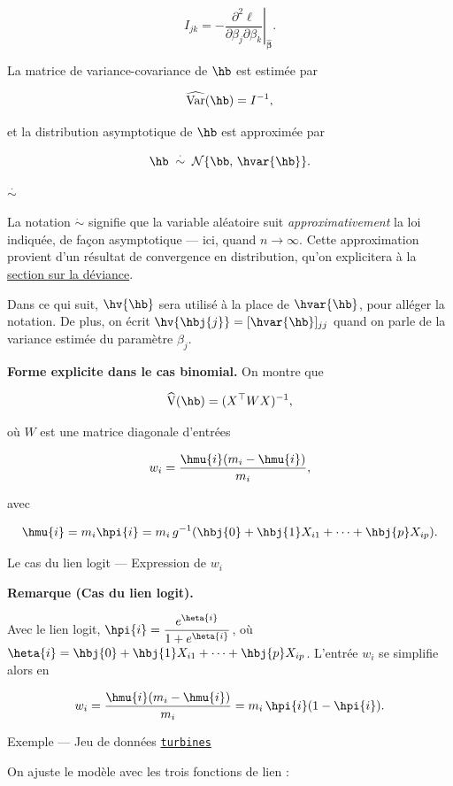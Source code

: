 \documentclass[
  french,
  letterpaper,
  DIV=11,
  numbers=noendperiod]{scrreprt}
\begin{document}
\[
I_{jk} = -\left.\frac{\partial^2 \ell}{\partial \beta_j \partial \beta_k}\right|_{\hat{\boldsymbol{\beta}}}.
\]

La matrice de variance-covariance de \(\hb\) est estimée par

\[
\widehat{\text{Var}}(\hb) = I^{-1},
\]

et la distribution asymptotique de \(\hb\) est approximée par

\[
\hb \;\overset{\cdot}{\sim}\; \mathcal{N}\{\bb,\, \hvar{\hb} \}.
\]

\(\overset{\cdot}{\sim}\)

La notation \(\dot\sim\) signifie que la variable aléatoire suit
\emph{approximativement} la loi indiquée, de façon asymptotique --- ici,
quand \(n\to\infty\). Cette approximation provient d'un résultat de
convergence en distribution, qu'on explicitera à la
\hyperref[sec-deviance]{section sur la déviance}.

Dans ce qui suit, \(\hv{\hb}\) sera utilisé à la place de
\(\hvar{\hb}\), pour alléger la notation. De plus, on écrit
\(\hv{\hbj{j}}=[\hvar{\hb}]_{jj}\) quand on parle de la variance estimée
du paramètre \(\beta_j\).

\textbf{Forme explicite dans le cas binomial.} On montre que

\[
\widehat{\text{V}}(\hb)  = (X^\top W X)^{-1},
\]

où \(W\) est une matrice diagonale d'entrées

\[
w_i = \frac{\hmu{i} (m_i - \hmu{i})}{m_i},
\]

avec

\[
\hmu{i} = m_i \hpi{i} = m_i\, g^{-1}(\hbj{0} + \hbj{1} X_{i1} + \cdots + \hbj{p} X_{ip}).
\]

{Le cas du lien logit --- Expression de \(w_i\)}

\textbf{Remarque (Cas du lien logit).}

Avec le lien logit, \(\hpi{i} = \dfrac{e^{\heta{i}}}{1+e^{\heta{i}}}\),
où \(\heta{i} = \hbj{0} + \hbj{1} X_{i1} + \cdots + \hbj{p} X_{ip}\).
L'entrée \(w_i\) se simplifie alors en

\[
w_i = \frac{\hmu{i}(m_i - \hmu{i})}{m_i} = m_i\, \hpi{i}(1-\hpi{i}).
\]

{Exemple --- Jeu de données \hyperref[data-turbines]{\texttt{turbines}}}

On ajuste le modèle avec les trois fonctions de lien :
\end{document}
